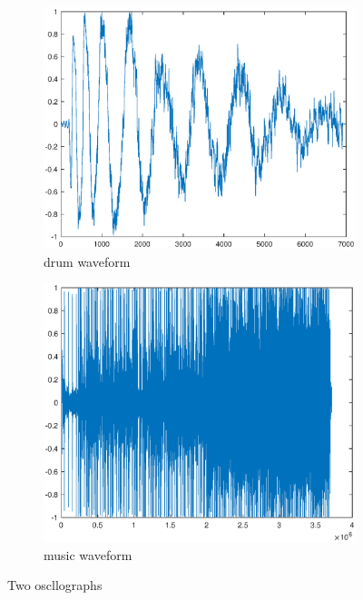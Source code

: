 \begin{figure}[h!]
	\centering
	\begin{subfigure}[t]{0.45\linewidth}
		\includegraphics[width=1\linewidth]{figures/part1/drum.eps}
		\caption{drum waveform}
		\label{fig:drum}
	\end{subfigure}
	\begin{subfigure}[t]{0.45\linewidth}
		\centering
		\includegraphics[width=1\linewidth]{figures/part1/piece_of_music.eps}
		\caption{music waveform}
		\label{fig:music}
	\end{subfigure}
	\caption{Two oscllographs}
	\label{fig:wave}
\end{figure} 

